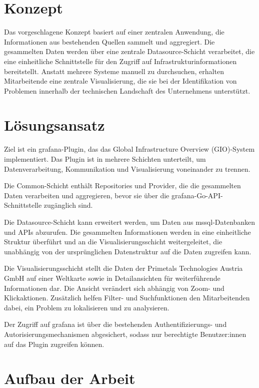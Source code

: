 \section{Konzept}
\label{sec:concept}

Das vorgeschlagene Konzept basiert auf einer zentralen Anwendung, die Informationen
aus bestehenden Quellen sammelt und aggregiert. Die gesammelten Daten werden über
eine zentrale Datasource-Schicht verarbeitet, die eine einheitliche Schnittstelle für
den Zugriff auf Infrastrukturinformationen bereitstellt. Anstatt mehrere Systeme
manuell zu durchsuchen, erhalten Mitarbeitende eine zentrale Visualisierung, die sie
bei der Identifikation von Problemen innerhalb der technischen Landschaft des
Unternehmens unterstützt.

\section{Lösungsansatz}
\label{sec:solution-approach}

Ziel ist ein \gls{grafana}-Plugin, das das Global Infrastructure Overview (GIO)-System
implementiert. Das Plugin ist in mehrere Schichten unterteilt, um Datenverarbeitung,
Kommunikation und Visualisierung voneinander zu trennen.

Die Common-Schicht enthält Repositories und Provider, die die gesammelten Daten
verarbeiten und aggregieren, bevor sie über die \gls{grafana}-Go-API-Schnittstelle
zugänglich sind.

Die Datasource-Schicht kann erweitert werden, um Daten aus \gls{mssql}-Datenbanken und
APIs abzurufen. Die gesammelten Informationen werden in eine einheitliche Struktur
überführt und an die Visualisierungsschicht weitergeleitet, die unabhängig von der
ursprünglichen Datenstruktur auf die Daten zugreifen kann.

Die Visualisierungsschicht stellt die Daten der Primetals Technologies Austria GmbH
auf einer Weltkarte sowie in Detailansichten für weiterführende Informationen dar. Die
Ansicht verändert sich abhängig von Zoom- und Klickaktionen. Zusätzlich helfen Filter-
und Suchfunktionen den Mitarbeitenden dabei, ein Problem zu lokalisieren und zu analysieren.

Der Zugriff auf \gls{grafana} ist über die bestehenden Authentifizierungs- und
Autorisierungsmechanismen abgesichert, sodass nur berechtigte Benutzer:innen auf das Plugin
zugreifen können.

\section{Aufbau der Arbeit}
\label{sec:structure-of-work}

